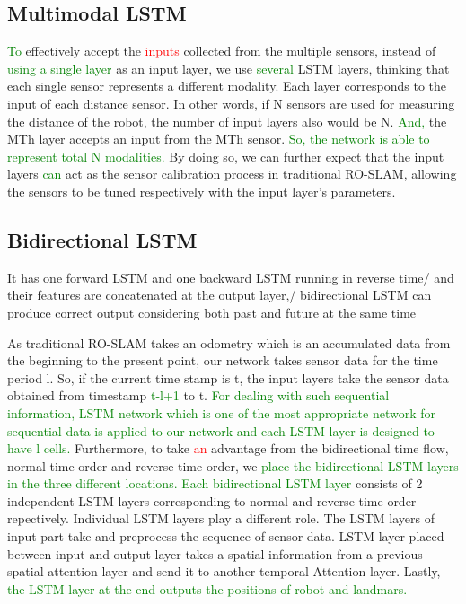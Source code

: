 \documentclass{ieeeaccess}
\begin{document}
\subsection{Multimodal LSTM}

\textcolor{green}{To} effectively accept the \textcolor{red}{inputs} collected from the multiple sensors, instead of \textcolor{green}{using a single layer} as an input layer, we use \textcolor{green}{several} LSTM layers, thinking that each single sensor represents a different modality. Each layer corresponds to the input of each distance sensor. In other words, if N sensors are used for measuring the distance of the robot, the number of input layers also would be N. \textcolor{green}{And,} the MTh layer accepts an input from the MTh sensor. \textcolor{green}{So, the network is able to represent total N modalities.} By doing so, we can further expect that the input layers \textcolor{green}{can} act as the sensor calibration process in traditional RO-SLAM, allowing the sensors to be tuned respectively with the input layer’s parameters.

\subsection{Bidirectional LSTM}

It has one forward LSTM and one backward LSTM running in reverse time/ and their features are concatenated at the output layer,/ bidirectional LSTM can produce correct output considering both past and future at the same time

As traditional RO-SLAM \cite{blanco2008pure,blanco2008efficient} takes an odometry which is an accumulated data from the beginning to the present point, our network takes sensor data for the time period l. So, if the current time stamp is t, the input layers take the sensor data obtained from timestamp \textcolor{green}{t-l+1} to t. \textcolor{green}{For dealing with such sequential information, LSTM network which is one of the most appropriate network for sequential data is applied to our network and each LSTM layer is designed to have l cells.} Furthermore, to take \textcolor{red}{an} advantage from the bidirectional time flow, normal time order and reverse time order, we \textcolor{green}{place the bidirectional LSTM layers in the three different locations. Each bidirectional LSTM layer} consists of 2 independent LSTM layers corresponding to normal and reverse time order repectively. Individual LSTM layers play a different role. The LSTM layers of input part take and preprocess the sequence of sensor data. LSTM layer placed between input and output layer takes a spatial information from a previous spatial attention layer and send it to another temporal Attention layer. Lastly, \textcolor{green}{the LSTM layer at the end outputs the positions of robot and landmars.}
\end{document}
